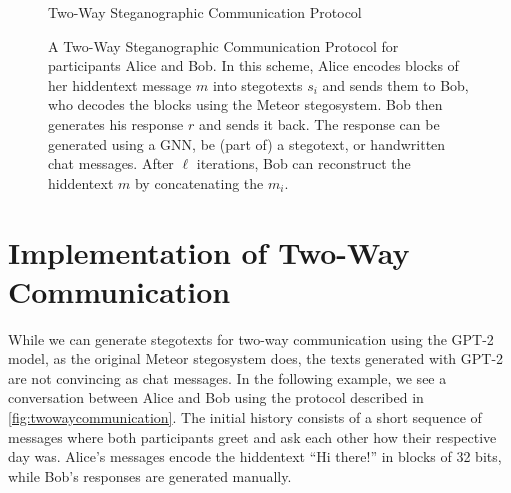 \begin{figure}[htbp]
  \centering
  \begin{msc}[instance distance=4cm,action width=5cm]{Two-Way Steganographic Communication Protocol}
    \nextlevel[2]
    \nextlevel[3]
    \nextlevel[2]
    \nextlevel[3]
    \nextlevel
    \nextlevel[2]
    \nextlevel[3]
    \nextlevel
    \nextlevel[2]
    \nextlevel[3]
    \nextlevel
  \end{msc}
  \caption{
  A Two-Way Steganographic Communication Protocol for participants Alice and Bob.
  In this scheme, Alice encodes blocks of her hiddentext message $m$ into stegotexts $s_i$ and sends them to Bob, who decodes the blocks using the Meteor stegosystem.
  Bob then generates his response $r$ and sends it back.
  The response can be generated using a GNN, be (part of) a stegotext, or handwritten chat messages.
  After $\ell$ iterations, Bob can reconstruct the hiddentext $m$ by concatenating the $m_i$.
  }
  \label{fig:twowaycommunication}
\end{figure}

\section{Implementation of Two-Way Communication}
While we can generate stegotexts for two-way communication using the GPT-2 model, as the original Meteor stegosystem does, the texts generated with GPT-2 are not convincing as chat messages. 
In the following example, we see a conversation between Alice and Bob using the protocol described in \autoref{fig:twowaycommunication}.
The initial history consists of a short sequence of messages where both participants greet and ask each other how their respective day was.
Alice's messages encode the hiddentext ``Hi there!'' in blocks of 32 bits, while Bob's responses are generated manually.


